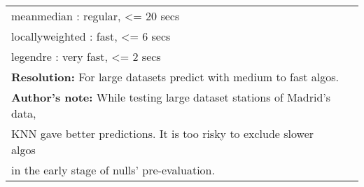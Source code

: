 \documentclass[a4paper]{article}
\begin{document}
\begin{longtable}{ll}
meanmedian      : regular,   <= 20 secs & \\[0pt]
locallyweighted : fast,      <=  6 secs & \\[0pt]
legendre        : very fast, <=  2 secs & \\[0pt]
\textbf{Resolution:} For large datasets predict with medium to fast algos. & \\[0pt]
\textbf{Author's note:} While testing large dataset stations of Madrid's data, & \\[0pt]
KNN gave better predictions. It is too risky to exclude slower algos & \\[0pt]
in the early stage of nulls' pre-evaluation. & \\[0pt]
\hline
\end{longtable}
\rmfamily
\end{document}
